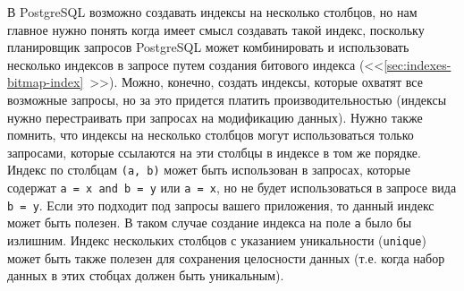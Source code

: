 В PostgreSQL возможно создавать индексы на несколько столбцов, но нам главное нужно понять когда имеет смысл создавать такой индекс, поскольку планировщик запросов PostgreSQL может комбинировать и использовать несколько индексов в запросе путем создания битового индекса (<<\ref{sec:indexes-bitmap-index}~>>). Можно, конечно, создать индексы, которые охватят все возможные запросы, но за это придется платить производительностью (индексы нужно перестраивать при запросах на модификацию данных). Нужно также помнить, что индексы на несколько столбцов могут использоваться только запросами, которые ссылаются на эти столбцы в индексе в том же порядке. Индекс по столбцам \lstinline!(a, b)! может быть использован в запросах, которые содержат \lstinline!a = x and b = y! или \lstinline!a = x!, но не будет использоваться в запросе вида \lstinline!b = y!. Если это подходит под запросы вашего приложения, то данный индекс может быть полезен. В таком случае создание индекса на поле \lstinline!a! было бы излишним. Индекс нескольких столбцов с указанием уникальности (\lstinline!unique!) может быть также полезен для сохранения целосности данных (т.е. когда набор данных в этих стобцах должен быть уникальным).
